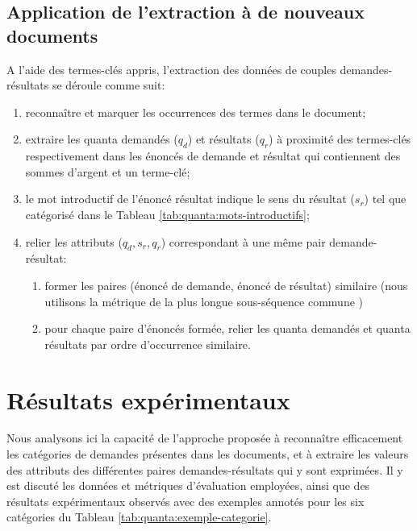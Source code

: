 \subsection{Application de l'extraction à de nouveaux documents}
A l'aide des termes-clés appris, l'extraction des données de couples demandes-résultats se déroule comme suit:
\begin{enumerate}
	\item reconnaître et marquer les occurrences des termes dans le document;
	\item extraire les quanta demandés ($q_d$) et résultats ($q_r$) à proximité des termes-clés respectivement dans les énoncés de demande et résultat qui contiennent des sommes d'argent et un terme-clé;
	\item le mot introductif de l'énoncé résultat indique le sens du résultat ($s_r$) tel que catégorisé dans le Tableau \ref{tab:quanta:mots-introductifs};
	\item relier les attributs ($q_d, s_r, q_r$) correspondant à une même pair demande-résultat:%
	\begin{enumerate}
		\item former les paires (énoncé de demande, énoncé de résultat) similaire (nous utilisons la métrique de \og la plus longue sous-séquence commune \fg{} \citep{bakkelund2009lcs}) 
		\item pour chaque paire d'énoncés formée, relier les quanta demandés et quanta résultats par ordre d'occurrence similaire.
	\end{enumerate}
\end{enumerate}

\section{Résultats expérimentaux}

Nous analysons ici la capacité de l'approche proposée à reconnaître efficacement les catégories de demandes présentes dans les documents, et à extraire les valeurs des attributs des différentes paires demandes-résultats qui y sont exprimées.  Il y est discuté les données et métriques d'évaluation employées, ainsi que des résultats expérimentaux observés avec des exemples annotés pour les six catégories du Tableau \ref{tab:quanta:exemple-categorie}. 


